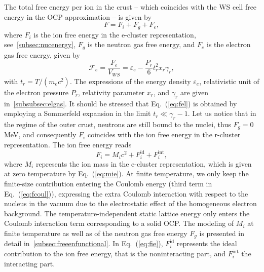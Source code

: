 The total free energy per ion in the crust -- which coincides with the WS cell
free energy in the OCP approximation -- is given by
%
\begin{equation}
  F = F_i + F_g + F_e,\label{eq:fperion}
\end{equation}
%
where $F_i$ is the ion free energy in the e-cluster representation, 
see~\ref{subsec:nucenergy}, $F_g$ is the neutron gas free energy, and $F_e$ 
is the electron gas free energy, given by~\cite{Haensel2007}
%
\begin{equation}
  \mathcal{F}_e = \frac{F_e}{V_{WS}} = \varepsilon_e -
  \frac{P_r}{6}t_r^2x_r\gamma_r,\label{eq:fel}
\end{equation}
%
with $t_r = T/(m_e c^2)$. The expressions of the energy density 
$\varepsilon_e$, relativistic unit of the electron pressure $P_r$, relativity
parameter $x_r$, and $\gamma_r$ are given in~\ref{subsubsec:elgas}. It should
be stressed that Eq.~(\ref{eq:fel}) is obtained by employing a Sommerfeld
expansion in the limit $t_r \ll \gamma_r - 1$.
Let us notice that in the regime of the outer crust, neutrons are still bound
to the nuclei, thus $F_g=0$ MeV, and consequently $F_i$ coincides with the 
ion free energy in the r-cluster representation.
The ion free energy reads
%
\begin{equation}
  F_i = M_i c^2 + F_i^{\text{id}} + F_i^{\text{int}},\label{eq:fie}
\end{equation}
%
{where $M_i$ represents the ion mass in the e-cluster representation,
  which is given at zero temperature by Eq.~(\ref{eq:mie}). 
  At finite temperature, we only keep the finite-size contribution entering
  the Coulomb energy (third term in Eq.~(\ref{eq:fcoul})), expressing the 
  extra Coulomb interaction with respect to the nucleus in the vacuum due to 
  the electrostatic effect of the homogeneous electron background. The
  temperature-independent static lattice energy only enters the Coulomb
  interaction term corresponding to a solid OCP. 
  The modeling of $M_i$ at finite temperature as well as of the neutron gas 
  free energy $F_g$ is presented in detail in~\ref{subsec:freeenfunctional}.}
In Eq.~(\ref{eq:fie}), $F_i^{\text{id}}$ represents the ideal contribution to
the ion free energy, that is the noninteracting part, and $F_i^{\text{int}}$
the interacting part.


